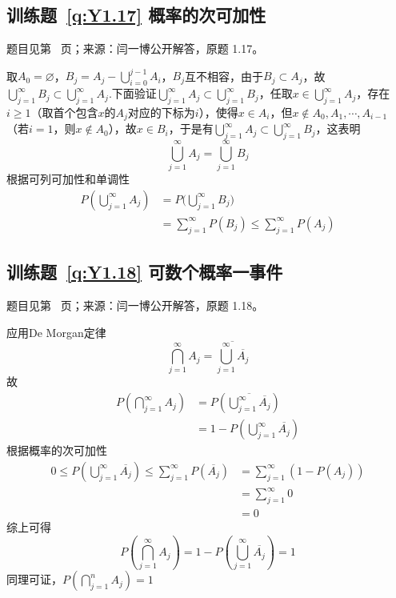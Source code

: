 \subsection*{训练题~\ref{q:Y1.17} 概率的次可加性}\label{a:Y1.17}{\small 题目见第~\pageref{q:Y1.17} 页；来源：闫一博公开解答，原题 1.17。}
\begin{solve}
取$A_0=\varnothing$，${B_j} = {A_j} - \bigcup\limits_{i = 0}^{j - 1} {{A_i}} $，$B_j$互不相容，由于$B_j\subset A_j$，故$ \bigcup\limits_{j = 1}^\infty  {{B_j}}  \subset \bigcup\limits_{j = 1}^\infty  {{A_j}} $.下面验证$ \bigcup\limits_{j = 1}^\infty  {{A_j}}  \subset \bigcup\limits_{j = 1}^\infty  {{B_j}} $，任取$x\in \bigcup\limits_{j = 1}^\infty  {{A_j}}$，存在$i\geqslant 1$（取首个包含$x$的$A_j$对应的下标为$i$），使得$x\in A_i$，但$x\notin A_0,A_1,\cdots,A_{i-1}$（若$i=1$，则$x\notin A_0$），故$x\in B_i$，于是有$ \bigcup\limits_{j = 1}^\infty  {{A_j}}  \subset \bigcup\limits_{j = 1}^\infty  {{B_j}} $，这表明
\[\bigcup\limits_{j = 1}^\infty  {{A_j}}  = \bigcup\limits_{j = 1}^\infty  {{B_j}}\] 根据可列可加性和单调性
\[\begin{aligned}
P(\bigcup\limits_{j = 1}^\infty  {{A_j}} ) &= P(\bigcup\limits_{j = 1}^\infty  {{B_j})}  \\&= \sum\limits_{j = 1}^\infty  {P({B_j})}  \leqslant \sum\limits_{j = 1}^\infty  {P({A_j})} 
\end{aligned}\]
\end{solve}

\subsection*{训练题~\ref{q:Y1.18} 可数个概率一事件}\label{a:Y1.18}{\small 题目见第~\pageref{q:Y1.18} 页；来源：闫一博公开解答，原题 1.18。}
\begin{solve}
应用De Morgan定律
\[\bigcap\limits_{j = 1}^\infty  {{A_j}}  = \overline {\bigcup\limits_{j = 1}^\infty  {\overline {{A_j}} } } \]
故
\[\begin{aligned}P(\bigcap\limits_{j = 1}^\infty  {{A_j}} ) &= P(\overline {\bigcup\limits_{j = 1}^\infty  {\overline {{A_j}} } } ) \\&= 1 - P(\bigcup\limits_{j = 1}^\infty  {\overline {{A_j}} } )\end{aligned}\]
根据概率的次可加性
\[\begin{aligned}0 \leqslant P(\bigcup\limits_{j = 1}^\infty  {\overline {{A_j}} } ) \leqslant \sum\limits_{j = 1}^\infty  {P(\overline {{A_j}} )}  &= \sum\limits_{j = 1}^\infty  {(1 - P({A_j}))}  \\&= \sum\limits_{j = 1}^\infty  0\\&=0 \end{aligned}\]
综上可得
\[P(\bigcap\limits_{j = 1}^\infty  {{A_j}} ) = 1 - P(\bigcup\limits_{j = 1}^\infty  {\overline {{A_j}} } ) = 1\]
同理可证，$P(\bigcap\limits_{j = 1}^n {{A_j}} ) = 1$
\end{solve}


